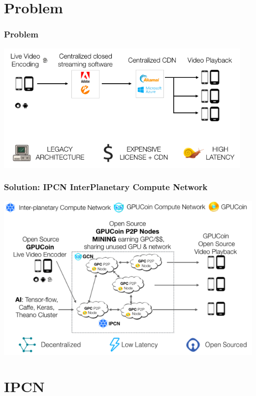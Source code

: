 \documentclass[10pt]{beamer}
\begin{document}
\section{Problem}
\begin{frame}[t]\frametitle{Problem}
 \includegraphics[width=0.95\textwidth]{static/problem-architecture-trans}
\end{frame}
\begin{frame}[t]\frametitle{Solution: IPCN InterPlanetary Compute Network}
 \includegraphics[width=.95\textwidth]{static/gpucoin-solution-trans-ai}

\end{frame}
\section{IPCN}

\end{document}

